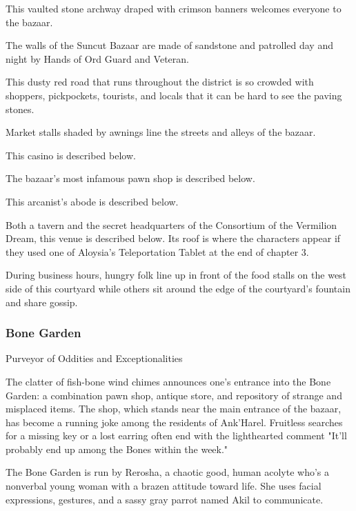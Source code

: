 \documentclass[10pt,a4paper,twoside,bg=print,twocolumn,openany,nodeprecatedcode]{dndbook}
\begin{document}
\begin{description}[nolistsep]
\item[T1: Welcome Arch.]
This vaulted stone archway draped with crimson banners welcomes everyone to the bazaar.
\item[T2: Battlements.]
The walls of the Suncut Bazaar are made of sandstone and patrolled day and night by Hands of Ord Guard and Veteran.
\item[T3: Central Street.]
This dusty red road that runs throughout the district is so crowded with shoppers, pickpockets, tourists, and locals that it can be hard to see the paving stones.
\item[T4: Market Stalls.]
Market stalls shaded by awnings line the streets and alleys of the bazaar.
\item[T5: Luck's Run.]
This casino is described below.
\item[T6: Bone Garden.]
The bazaar's most infamous pawn shop is described below.
\item[T7: Mystic Pursuits.]
This arcanist's abode is described below.
\item[T8: First Eclipse.]
Both a tavern and the secret headquarters of the Consortium of the Vermilion Dream, this venue is described below. Its roof is where the characters appear if they used one of Aloysia's Teleportation Tablet at the end of chapter 3.
\item[T9: Courtyard.]
During business hours, hungry folk line up in front of the food stalls on the west side of this courtyard while others sit around the edge of the courtyard's fountain and share gossip.
\end{description}

\subsubsection{Bone Garden}
Purveyor of Oddities and Exceptionalities

The clatter of fish-bone wind chimes announces one's entrance into the Bone Garden: a combination pawn shop, antique store, and repository of strange and misplaced items. The shop, which stands near the main entrance of the bazaar, has become a running joke among the residents of Ank'Harel. Fruitless searches for a missing key or a lost earring often end with the lighthearted comment "It'll probably end up among the Bones within the week."

The Bone Garden is run by Rerosha, a chaotic good, human acolyte who's a nonverbal young woman with a brazen attitude toward life. She uses facial expressions, gestures, and a sassy gray parrot named Akil to communicate.
\end{document}
